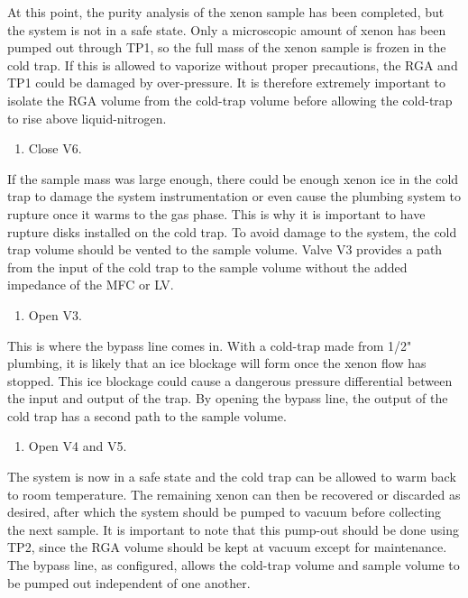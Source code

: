 \documentclass[12pt]{article}
\begin{document}
\noindent At this point, the purity analysis of the xenon sample has been completed, but the system is not in a safe state. Only a microscopic amount of xenon has been pumped out through TP1, so the full mass of the xenon sample is frozen in the cold trap. If this is allowed to vaporize without proper precautions, the RGA and TP1 could be damaged by  over-pressure. It is therefore extremely important to isolate the RGA volume from the cold-trap volume before allowing the cold-trap to rise above liquid-nitrogen.
\begin{enumerate}[resume]
\item \label{step:analysis_stop} Close V6.
\end{enumerate}
\noindent If the sample mass was large enough, there could be enough xenon ice in the cold trap to damage the system instrumentation or even cause the plumbing system to rupture once it warms to the gas phase. This is why it is important to have rupture disks installed on the cold trap. To avoid damage to the system, the cold trap volume should be vented to the sample volume. Valve V3 provides a path from the input of the cold trap to the sample volume without the added impedance of the MFC or LV.
\begin{enumerate}[resume]
\item Open V3. 
\end{enumerate}
\noindent This is where the bypass line comes in. With a cold-trap made from 1/2" plumbing, it is likely that an ice blockage will form once the xenon flow has stopped. This ice blockage could cause a dangerous pressure differential between the input and output of the trap. By opening the bypass line, the output of the cold trap has a second path to the sample volume.
\begin{enumerate}[resume]
\item Open V4 and V5. 
\end{enumerate}

The system is now in a safe state and the cold trap can be allowed to warm back to room temperature. The remaining xenon can then be recovered or discarded as desired, after which the system should be pumped to vacuum before collecting the next sample. It is important to note that this pump-out should be done using TP2, since the RGA volume should be kept at vacuum except for maintenance. The bypass line, as configured, allows the cold-trap volume and sample volume to be pumped out independent of one another.
\end{document}
